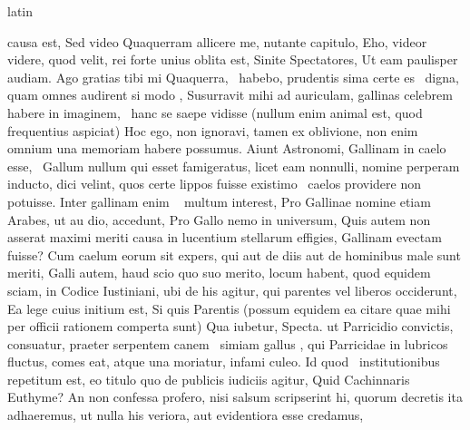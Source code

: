 \documentclass[12pt]{book}
\renewenvironment{latin}
    	{\begin{hyphenrules}{latin}}
    	{\end{hyphenrules}}
\begin{document}
\begin{pages}
\begin{latin}
\begin{Leftside}
                    causa est, Sed video Quaquerram allicere me, nutante capitulo, 
                    Eho, videor videre, quod velit, rei forte unius oblita est, 
                    Sinite  Spectatores, Ut eam paulisper audiam. 
                    Ago gratias tibi mi Quaquerra,  \ampersand\ habebo, prudentis sima certe es  \ampersand\ digna, quam omnes audirent si modo , 
                    Susurravit mihi ad auriculam, gallinas celebrem habere in  imaginem,  \ampersand\ hanc se saepe vidisse (nullum enim animal est, quod  frequentius aspiciat) 
                    Hoc ego,  non ignoravi,  tamen ex oblivione, non enim omnium una memoriam habere possumus. 
                    Aiunt Astronomi, Gallinam in caelo esse,  \ampersand\ Gallum nullum qui esset famigeratus, 
                    licet eam nonnulli, nomine perperam inducto,  dici velint, quos certe lippos fuisse existimo  \ampersand\ caelos providere non potuisse. 
                    Inter gallinam enim  \ampersand\  multum interest, 
                    Pro Gallinae nomine etiam Arabes, ut au   dio, accedunt, 
                    Pro Gallo nemo in universum, Quis autem non asserat maximi meriti causa in lucentium stellarum effigies, Gallinam evectam fuisse? 
                    Cum caelum eorum sit expers, 
                    qui aut de diis aut de hominibus male sunt meriti, Galli autem, haud scio quo suo merito, locum habent, 
                    quod equidem sciam,  in Codice Iustiniani, ubi de his agitur, qui parentes vel liberos occiderunt, 
                    Ea lege cuius initium est, 
                    Si quis Parentis (possum equidem ea citare quae mihi per officii rationem comperta sunt) 
                    Qua iubetur, Specta. ut Parricidio convictis, consuatur, praeter serpentem canem  \ampersand\ simiam gallus , 
                    qui Parricidae in lubricos fluctus, comes eat, atque una moriatur, infami culeo. 
                    Id quod  \ampersand\ institutionibus repetitum est, eo titulo quo de publicis iudiciis agitur, Quid Cachinnaris Euthyme? 
                    An non confessa profero, nisi salsum scripserint hi, 
                    quorum decretis ita adhaeremus, ut nulla his veriora, aut evidentiora esse credamus, 

\end{Leftside}
\end{latin}
\end{pages}
\end{document}
